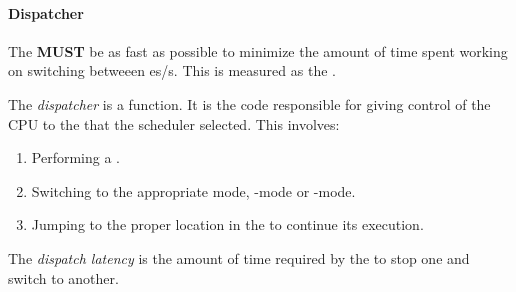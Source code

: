 \paragraph{Dispatcher}\label{par:Dispatcher}
The  \textbf{MUST} be as fast as possible to minimize the amount of time spent working on switching betweeen es/s.
This is measured as the .

\begin{definition}[Dispatcher]\label{def:Dispatcher}
  The \emph{dispatcher} is a  function.
  It is the code responsible for giving control of the CPU to the  that the scheduler selected.
  This involves:
  \begin{enumerate}[noitemsep]
  \item Performing a .
  \item Switching to the appropriate mode, -mode or -mode.
  \item Jumping to the proper location in the  to continue its execution.
  \end{enumerate}
\end{definition}

\begin{definition}\label{def:Dispatch_Latency}
  The \emph{dispatch latency} is the amount of time required by the  to stop one  and switch to another.
\end{definition}

